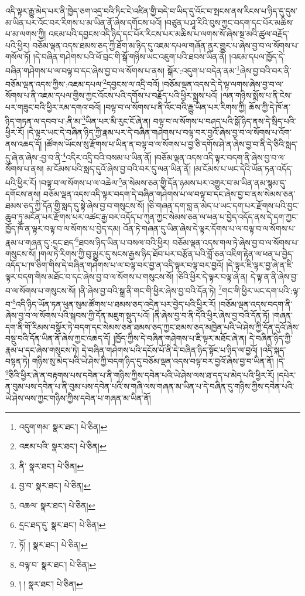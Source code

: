 འདི་ལྟར་རྒྱུ་མེད་པར་ནི་ཁྱེད་ཅག་འདྲ་བའི་ཏིང་ངེ་འཛིན་གྱི་བདེ་བ་ཡིད་དུ་འོང་བ་སྤངས་ནས་རིངས་པ་ཉིད་དུ་དུས་མ་ཡིན་པར་འོང་བར་རིགས་པ་མ་ཡིན་ནོ་ཞེས་དགོངས་པའོ། །བཙུན་པ་ཤཱ་རིའི་བུས་ཀྱང་བདག་དང་པོར་མཆིས་པ་མ་ལགས་ཀྱི། འཇམ་པའི་དབྱངས་འདི་ཉིད་དང་པོར་རིངས་པར་མཆིས་པ་ལགས་སོ་ཞེས་སྔ་མའི་ཚུལ་བརྗོད་པའི་ཕྱིར། བཅོམ་ལྡན་འདས་ཐམས་ཅད་ཀྱི་ཐོག་མ་ཉིད་དུ་འཇམ་དཔལ་གཞོན་ནུར་གྱུར་པ་ཞེས་བྱ་བ་ལ་སོགས་པ་གསོལ་ཏོ། །དེ་བཞིན་གཤེགས་པའི་ཕོ་བྲང་གི་སྒོ་གཉིས་ཡང་འཇུག་པའི་ཐབས་ཡིན་ནོ། །འཇམ་དཔལ་ཁྱོད་དེ་བཞིན་གཤེགས་པ་ལ་བལྟ་བ་དང་ཞེས་བྱ་བ་ལ་སོགས་པ་ནས། སྒོར་:འདུག་པ་བདེན་ནམ་\footnote{འདུག་གམ་  སྣར་ཐང་།  པེ་ཅིན། }ཞེས་བྱ་བའི་བར་ནི་བཅོམ་ལྡན་འདས་ཀྱིས་:འཇམ་དཔལ་\footnote{འཇམ་པའི་  སྣར་ཐང་།  པེ་ཅིན། }དབྱངས་ལ་འདྲི་བའོ། །བཅོམ་ལྡན་འདས་དེ་དེ་ལྟ་ལགས་ཞེས་བྱ་བ་ལ་སོགས་པ་ནི་འཇམ་དཔལ་གྱིས་ཀྱང་འོངས་པའི་དགོས་པ་བརྗོད་པའི་ཕྱིར་སྨྲས་པའོ། །ལན་གཉིས་སྨོས་པ་ནི་ངེས་པར་གཟུང་བའི་ཕྱིར་རམ་དགའ་བའོ། །བལྟ་བ་ལ་སོགས་པ་ནི་འོང་བའི་རྒྱུ་ཡིན་པར་རིགས་ཀྱི། ཆོས་ཀྱི་དེ་ཁོ་ན་ཉིད་གཏན་ལ་དབབ་པ་:ནི་མ་\footnote{ནི་  སྣར་ཐང་།  པེ་ཅིན། }ཡིན་པར་མི་རུང་ངོ་ཞེ་ན། བལྟ་བ་ལ་སོགས་པ་བཤད་པའི་སྒོ་ཉིད་ནས་དེ་སྲིད་པའི་ཕྱིར་རོ། །དེ་ལྟར་ཡང་དེ་བཞིན་ཉིད་ཀྱི་རྣམ་པར་དེ་བཞིན་གཤེགས་པ་བལྟ་བར་བྱའོ་ཞེས་བྱ་བ་ལ་སོགས་པ་འོག་ནས་འཆད་དོ། །ཚོགས་ཡོངས་སུ་རྫོགས་པ་ཡིན་ན་བལྟ་བ་ལ་སོགས་པ་བྱ་ཅི་དགོས་ཤེ་ན་ཞེས་བྱ་བ་ནི་དེ་ཅིའི་སླད་དུ་ཞེ་ན་ཞེས་:བྱ་བ་ནི་\footnote{བྱ་བ་  སྣར་ཐང་།  པེ་ཅིན། }འདིར་འདྲི་བའི་བསམ་པ་ཡིན་ནོ། །བཅོམ་ལྡན་འདས་འདི་ལྟར་བདག་ནི་ཞེས་བྱ་བ་ལ་སོགས་པ་ནས། མ་ངོམས་པའི་སླད་དུའོ་ཞེས་བྱ་བའི་བར་དུ་ལན་ཡིན་ནོ། །མ་ངོམས་པ་ཡང་དེའི་ཡོན་ཏན་འདོད་པའི་ཕྱིར་རོ། །བལྟ་བ་ལ་སོགས་པ་ལ་འཆེལ་\footnote{འཆལ་  སྣར་ཐང་།  པེ་ཅིན། }ན་སེམས་ཅན་གྱི་དོན་ཉམས་པར་འགྱུར་བ་མ་ཡིན་ནམ་སྙམ་དུ་དགོངས་ནས། བཅོམ་ལྡན་འདས་འདི་ལྟར་བདག་དེ་བཞིན་གཤེགས་པ་ལ་བལྟ་བ་དང་ཞེས་བྱ་བ་ནས་སེམས་ཅན་ཐམས་ཅད་ཀྱི་དོན་གྱི་སླད་དུ་སྟེ་ཞེས་བྱ་བ་གསུངས་སོ། །ཅི་གཞན་དག་བླ་ན་མེད་པ་ཡང་དག་པར་རྫོགས་པའི་བྱང་ཆུབ་ཏུ་མངོན་པར་རྫོགས་པར་འཚང་རྒྱ་བར་འདོད་པ་ཀུན་ཀྱང་སེམས་ཅན་ལ་ཕན་པ་བྱེད་འདོད་ནས་དེ་དག་ཀྱང་ཁྱོད་ཁོ་ན་ལྟར་བལྟ་བ་ལ་སོགས་པ་བྱེད་དམ། འོན་ཏེ་གཞན་དུ་ཡིན་ཞེས་དེ་ལྟར་དོགས་པ་ལ་བལྟ་བ་ལ་སོགས་པ་རྣམ་པ་གཞན་དུ་:དྲང་ཐད་\footnote{དྲང་ཐད་དུ་  སྣར་ཐང་།  པེ་ཅིན། }ཐབས་ཉིད་ཡིན་པ་བསལ་བའི་ཕྱིར། བཅོམ་ལྡན་འདས་གལ་ཏེ་ཞེས་བྱ་བ་ལ་སོགས་པ་གསུངས་སོ། །གལ་ཏེ་རིགས་ཀྱི་བུ་མྱུར་དུ་སངས་རྒྱས་ཉིད་ཐོབ་པར་བརྩོན་པའི་བློ་ཅན་འཇིག་རྟེན་ལ་ཕན་པ་བྱེད་འདོད་པ་ཁ་ཅིག་གིས་དེ་བཞིན་གཤེགས་པ་ལ་བལྟ་བར་བྱ་ན་འདི་ལྟར་བལྟ་བར་བྱའོ། །དེ་ལྟར་ཇི་ལྟར་བྱ་ཞེ་ན་ཇི་ལྟར་བདག་གིས་མཐོང་བ་དང་ཞེས་བྱ་བ་ལ་སོགས་པ་གསུངས་སོ། །ཅིའི་ཕྱིར་དེ་ལྟར་བལྟ་ཞེ་ན། དེ་ལྟ་ན་ནི་ཞེས་བྱ་བ་ལ་སོགས་པ་གསུངས་སོ། །ནི་ཞེས་བྱ་བའི་སྒྲ་ནི་གང་གི་ཕྱིར་ཞེས་བྱ་བའི་དོན་ཏེ། \footnote{ཏོ། །   སྣར་ཐང་།  པེ་ཅིན། }གང་གི་ཕྱིར་ཡང་དག་པའི་:ལྟ་བ་\footnote{བལྟ་བ་  སྣར་ཐང་།  པེ་ཅིན། }འདི་ཉིད་ཡོན་ཏན་ཕུན་སུམ་ཚོགས་པ་ཐམས་ཅད་འདྲེན་པར་བྱེད་པའི་ཕྱིར་རོ། །བཅོམ་ལྡན་འདས་བདག་ནི་ཞེས་བྱ་བ་ལ་སོགས་པའི་སྐབས་ཀྱི་དོན་མཇུག་སྡུད་པའོ། །ནི་ཞེས་བྱ་བ་ནི་དེའི་ཕྱིར་ཞེས་བྱ་བའི་དོན་ཏོ། །གཞན་དག་ནི་གོ་རིམས་བསྣོར་ཏེ་བདག་དང་སེམས་ཅན་ཐམས་ཅད་ཀྱང་ཐམས་ཅད་མཁྱེན་པའི་ཡེ་ཤེས་ཀྱི་དོན་དུའོ་ཞེས་བསྡུ་བའི་དོན་ཡིན་ནོ་ཞེས་ཀྱང་འཆད་དོ། །ཁྱོད་ཀྱིས་དེ་བཞིན་གཤེགས་པ་ཇི་ལྟར་མཐོང་ཞེ་ན། དེ་བཞིན་ཉིད་ཀྱི་རྣམ་པ་དང་ཞེས་གསུངས་ཏེ། དེ་བཞིན་གཤེགས་པའི་དངོས་པོ་ནི་དེ་བཞིན་ཉིད་སྟོང་པ་ཉིད་ལ་བྱའོ། །འདི་སྐད་བསྟན་ཏེ། གཉིས་སུ་མེད་པའི་ཡེ་ཤེས་ཀྱི་བདག་ཉིད་དུ་བཅོམ་ལྡན་འདས་བལྟ་བར་བྱའོ་ཞེས་བྱ་བ་ཡིན་ནོ། །དེ་\footnote{། །  སྣར་ཐང་།  པེ་ཅིན། }ཅིའི་ཕྱིར་ཞེ་ན་བརྟགས་པས་དབེན་པ་ནི་གཉིས་ཀྱིས་དབེན་པའི་ཡེ་ཤེས་ལས་ཐ་དད་པ་མེད་པའི་ཕྱིར་རོ། །དཔེར་ན་བུམ་པས་དབེན་པ་ནི་བུམ་པས་དབེན་པའི་ས་གཞི་ལས་གཞན་མ་ཡིན་པ་དེ་བཞིན་དུ་གཉིས་ཀྱིས་དབེན་པའི་ཡེ་ཤེས་ལས་ཀྱང་གཉིས་ཀྱིས་དབེན་པ་གཞན་མ་ཡིན་ནོ། 